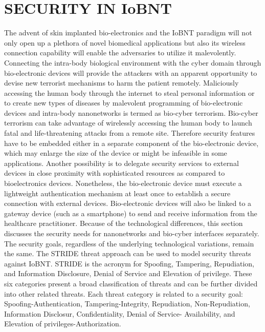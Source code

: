 \documentclass[12pt,a4paper]{report}
\begin{document}
\chapter{SECURITY IN IoBNT}
The advent of skin implanted bio-electronics and the IoBNT 
paradigm will not only open up a plethora of novel biomedical
 applications but also its wireless connection capability will
  enable the adversaries to utilize it malevolently. Connecting
   the intra-body biological environment with the cyber domain
    through bio-electronic devices will provide the attackers 
    with an apparent opportunity to devise new terrorist 
    mechanisms to harm the patient remotely. Maliciously 
    accessing the human body through the internet to steal 
    personal information or to create new types of diseases 
    by malevolent programming of bio-electronic devices and 
    intra-body nanonetworks is termed as bio-cyber terrorism. 
    Bio-cyber terrorism can take advantage of wirelessly 
    accessing the human body to launch fatal and 
    life-threatening attacks from a remote site. 
    Therefore security features have to be embedded either
     in a separate component of the bio-electronic device, 
     which may enlarge the size of the device or might be
      infeasible in some applications. Another possibility is
       to delegate security services to external devices in 
       close proximity with sophisticated resources as compared
        to bioelectronics devices. Nonetheless, the bio-electronic
         device must execute a lightweight authentication mechanism
         at least once to establish a secure connection with external
          devices. Bio-electronic devices will also be linked to a
          gateway device (such as a smartphone) to send and receive 
          information from the healthcare practitioner. Because of 
          the technological differences, this section discusses the 
          security needs for nanonetworks and bio-cyber interfaces 
          separately. The security goals, regardless of the underlying 
          technological variations, remain the same. The STRIDE threat 
          approach can be used to model security threats against IoBNT. 
          STRIDE is the acronym for Spoofing, Tampering, Repudiation, 
          and Information Disclosure, Denial of Service and Elevation 
          of privilege. These six categories present a broad classification 
          of threats and can be further divided into other related threats.
          Each threat category is related to a security goal: Spoofing-Authentication, 
          Tampering-Integrity, Repudiation, Non-Repudiation, Information Disclosur, 
          Confidentiality, Denial of Service- Availability, and Elevation of 
          privileges-Authorization.
\end{document}
